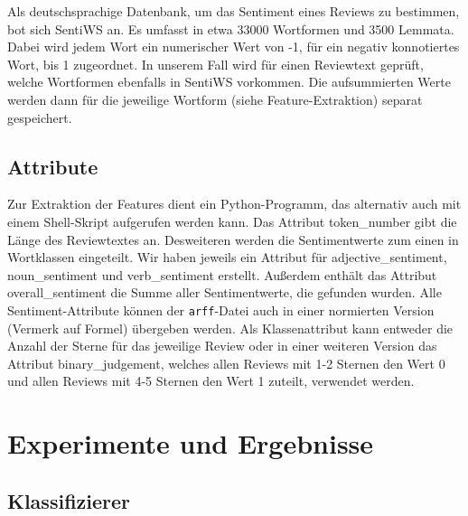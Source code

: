 \documentclass[a4paper]{article}
\newcommand{\ourextension}[1]{\texttt{#1}}
\begin{document}
Als deutschsprachige Datenbank, um das Sentiment eines Reviews zu bestimmen, bot sich SentiWS an. Es umfasst in etwa 33000 Wortformen und 3500 Lemmata. Dabei wird jedem Wort ein numerischer Wert von -1, für ein negativ konnotiertes Wort, bis 1 zugeordnet. In unserem Fall wird für einen Reviewtext geprüft, welche Wortformen ebenfalls in SentiWS vorkommen. Die aufsummierten Werte werden dann für die jeweilige Wortform (siehe Feature-Extraktion) separat gespeichert.


\subsection{Attribute}

Zur Extraktion der Features dient ein Python-Programm, das alternativ auch mit einem Shell-Skript aufgerufen werden kann.\newline 
Das Attribut token\_number gibt die Länge des Reviewtextes an. Desweiteren werden die Sentimentwerte zum einen in Wortklassen eingeteilt. Wir haben jeweils ein Attribut für adjective\_sentiment, noun\_sentiment und verb\_sentiment erstellt. Außerdem enthält das Attribut overall\_sentiment die Summe aller Sentimentwerte, die gefunden wurden.\newline
Alle Sentiment-Attribute können der \ourextension{arff}-Datei auch in einer normierten Version (Vermerk auf Formel) übergeben werden. 
Als Klassenattribut kann entweder die Anzahl der Sterne für das jeweilige Review oder in einer weiteren Version das Attribut binary\_judgement, welches allen Reviews mit 1-2 Sternen den Wert 0 und allen Reviews mit 4-5 Sternen den Wert 1 zuteilt, verwendet werden.


\section{Experimente und Ergebnisse}


\subsection{Klassifizierer}
\end{document}
